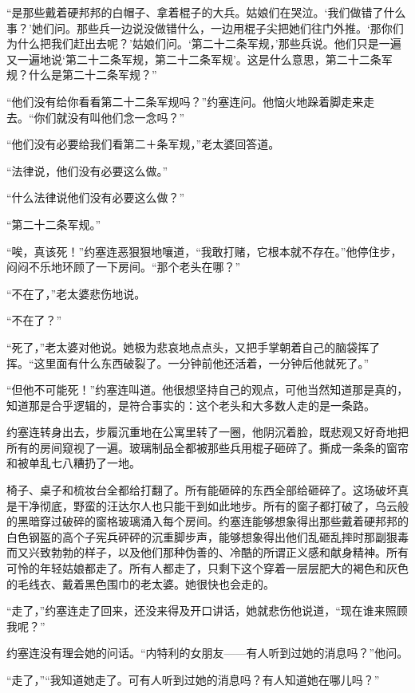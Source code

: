     “是那些戴着硬邦邦的白帽子、拿着棍子的大兵。姑娘们在哭泣。‘我们做错了什么事？’她们问。那些兵一边说没做错什么，一边用棍子尖把她们往门外推。‘那你们为什么把我们赶出去呢？’姑娘们问。‘第二十二条军规，’那些兵说。他们只是一遍又一遍地说‘第二十二条军规，第二十二条军规’。这是什么意思，第二十二条军规？什么是第二十二条军规？”

 


    “他们没有给你看看第二十二条军规吗？”约塞连问。他恼火地跺着脚走来走去。“你们就没有叫他们念一念吗？”

    “他们没有必要给我们看第二＋条军规，”老太婆回答道。

    “法律说，他们没有必要这么做。”

    “什么法律说他们没有必要这么做？”

    “第二十二条军规。”

    “唉，真该死！”约塞连恶狠狠地嚷道，“我敢打赌，它根本就不存在。”他停住步，闷闷不乐地环顾了一下房间。“那个老头在哪？”

    “不在了，”老太婆悲伤地说。

    “不在了？”

    “死了，”老太婆对他说。她极为悲哀地点点头，又把手掌朝着自己的脑袋挥了挥。“这里面有什么东西破裂了。一分钟前他还活着，一分钟后他就死了。”

    “但他不可能死！”约塞连叫道。他很想坚持自己的观点，可他当然知道那是真的，知道那是合乎逻辑的，是符合事实的：这个老头和大多数人走的是一条路。

 


    约塞连转身出去，步履沉重地在公寓里转了一圈，他阴沉着脸，既悲观又好奇地把所有的房间窥视了一遍。玻璃制品全都被那些兵用棍子砸碎了。撕成一条条的窗帘和被单乱七八糟扔了一地。

    椅子、桌子和梳妆台全都给打翻了。所有能砸碎的东西全部给砸碎了。这场破坏真是干净彻底，野蛮的汪达尔人也只能干到如此地步。所有的窗子都打破了，乌云般的黑暗穿过破碎的窗格玻璃涌入每个房间。约塞连能够想象得出那些戴着硬邦邦的白色钢盔的高个子宪兵砰砰的沉重脚步声，能够想象得出他们乱砸乱摔时那副狠毒而又兴致勃勃的样子，以及他们那种伪善的、冷酷的所谓正义感和献身精神。所有可怜的年轻姑娘都走了。所有人都走了，只剩下这个穿着一层层肥大的褐色和灰色的毛线衣、戴着黑色围巾的老太婆。她很快也会走的。

    “走了，”约塞连走了回来，还没来得及开口讲话，她就悲伤他说道，“现在谁来照顾我呢？”

    约塞连没有理会她的问话。“内特利的女朋友——有人听到过她的消息吗？”他问。

    “走了，”“我知道她走了。可有人听到过她的消息吗？有人知道她在哪儿吗？”

